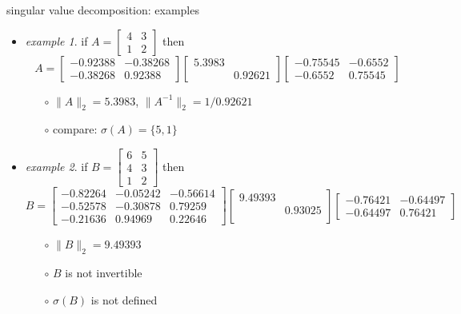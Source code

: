 \documentclass[10pt,hyperref]{beamer}
\newcommand{\ds}{\displaystyle}
\begin{document}
\begin{frame}{singular value decomposition: examples}

\begin{itemize}
\small
\item \emph{example 1}. if $\ds A = \begin{bmatrix} 4 & 3 \\ 1 & 2 \end{bmatrix}$ then
    $$A =
\begin{bmatrix}    -0.92388  &  -0.38268 \\  -0.38268   &  0.92388 \end{bmatrix}
\begin{bmatrix}      5.3983  &      \\   &  0.92621  \end{bmatrix}
\begin{bmatrix}    -0.75545  & -0.6552 \\  -0.6552 & 0.75545 \end{bmatrix}$$
    \begin{itemize}
    \item[$\circ$] $\|A\|_2 = 5.3983$, $\|A^{-1}\|_2 = 1/0.92621$
    \item[$\circ$] compare: $\sigma(A) = \{5,1\}$
    \end{itemize}

\bigskip
\item \emph{example 2}. if $\ds B = \begin{bmatrix} 6 & 5 \\ 4 & 3 \\ 1 & 2 \end{bmatrix}$ then
\footnotesize
    $$B =
\begin{bmatrix} -0.82264 & -0.05242 & -0.56614 \\
                -0.52578 & -0.30878 & 0.79259 \\
                -0.21636 & 0.94969 & 0.22646 \end{bmatrix}
\begin{bmatrix} 9.49393  & \\ & 0.93025 \\ & \end{bmatrix}
\begin{bmatrix} -0.76421 & -0.64497 \\ -0.64497 & 0.76421 \end{bmatrix}$$
\small
    \begin{itemize}
    \item[$\circ$] $\|B\|_2 = 9.49393$
    \item[$\circ$] $B$ is not invertible
    \item[$\circ$] $\sigma(B)$ is not defined
    \end{itemize}

\end{itemize}
\end{frame}
\end{document}
